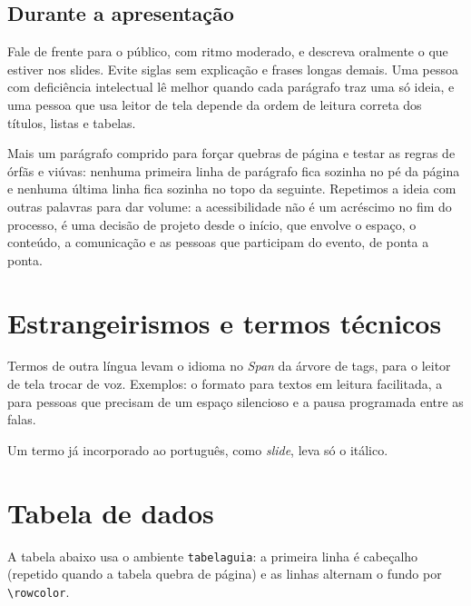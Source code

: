 \section{Durante a apresentação}

Fale de frente para o público, com ritmo moderado, e descreva oralmente o que
estiver nos slides. Evite siglas sem explicação e frases longas demais. Uma
pessoa com deficiência intelectual lê melhor quando cada parágrafo traz uma só
ideia, e uma pessoa que usa leitor de tela depende da ordem de leitura correta
dos títulos, listas e tabelas.

Mais um parágrafo comprido para forçar quebras de página e testar as regras de
órfãs e viúvas: nenhuma primeira linha de parágrafo fica sozinha no pé da página
e nenhuma última linha fica sozinha no topo da seguinte. Repetimos a ideia com
outras palavras para dar volume: a acessibilidade não é um acréscimo no fim do
processo, é uma decisão de projeto desde o início, que envolve o espaço, o
conteúdo, a comunicação e as pessoas que participam do evento, de ponta a ponta.

\chapter{Estrangeirismos e termos técnicos}

Termos de outra língua levam o idioma no \emph{Span} da árvore de tags, para o
leitor de tela trocar de voz. Exemplos: o formato 
para textos em leitura facilitada, a  para
pessoas que precisam de um espaço silencioso e a pausa 
programada entre as falas.

Um termo já incorporado ao português, como \emph{slide}, leva só o itálico.

\chapter{Tabela de dados}

A tabela abaixo usa o ambiente \texttt{tabelaguia}: a primeira linha é
cabeçalho (repetido quando a tabela quebra de página) e as linhas alternam o
fundo por \verb|\rowcolor|.

